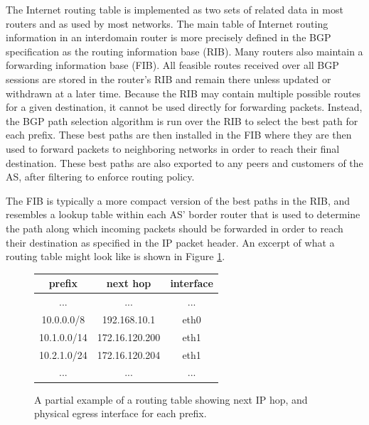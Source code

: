 The Internet routing table is implemented as two sets of related data in most
routers and as used by most networks. The main table of Internet routing
information in an interdomain router is more precisely defined in the BGP
specification \cite{rfc4271} as the routing information base (RIB). Many
routers also maintain a forwarding information base (FIB). All feasible routes
received over all BGP sessions are stored in the router's RIB and remain there
unless updated or withdrawn at a later time. Because the RIB may contain
multiple possible routes for a given destination, it cannot be used directly
for forwarding packets. Instead, the BGP path selection algorithm is run over
the RIB to select the best path for each prefix. These best paths are then
installed in the FIB where they are then used to forward packets to
neighboring networks in order to reach their final destination. These best
paths are also exported to any peers and customers of the AS, after
filtering to enforce routing policy.

The FIB is typically a more compact version of the best paths in the RIB, and
resembles a lookup table within each AS' border router that is used to
determine the path along which incoming packets should be forwarded in order to
reach their destination as specified in the IP packet header. An excerpt of
what a routing table might look like is shown in Figure
\ref{fig:ex_routing_table}.

\begin{figure}[h!]
    \begin{center}
    \begin{singlespace}
        \begin{tabular}{c | c | c}
            prefix & next hop & interface \\
            \hline
            ... & ... & ... \\
            10.0.0.0/8  & 192.168.10.1   & eth0 \\
            10.1.0.0/14 & 172.16.120.200 & eth1 \\
            10.2.1.0/24 & 172.16.120.204 & eth1 \\
            ... & ... & ...
        \end{tabular}
    \end{singlespace}
    \end{center}
\caption[A partial example of a routing table]{A partial example of a routing
table showing next IP hop, and physical egress interface for each prefix.}
\label{fig:ex_routing_table}
\end{figure}


